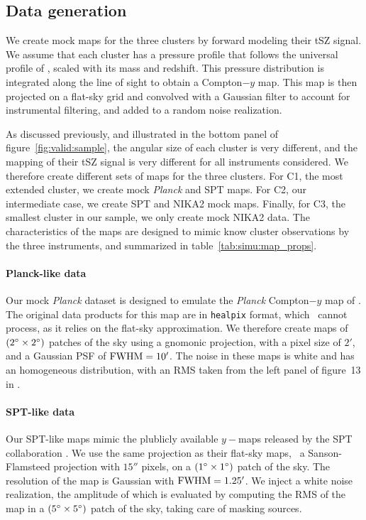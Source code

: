\subsection{Data generation}

We create mock maps for the three clusters by forward modeling their tSZ signal.
We assume that each cluster has a pressure profile that follows the universal profile of \aten, scaled with its mass and redshift.
This pressure distribution is integrated along the line of sight to obtain a Compton$-y$ map.
This map is then projected on a flat-sky grid and convolved with a Gaussian filter to account for instrumental filtering, and added to a random noise realization.

As discussed previously, and illustrated in the bottom panel of figure~\ref{fig:valid:sample}, the angular size of each cluster is very different, and the mapping of their tSZ signal is very different for all instruments considered.
We therefore create different sets of maps for the three clusters.
For C1, the most extended cluster, we create mock \textit{Planck} and SPT maps.
For C2, our intermediate case, we create SPT and NIKA2 mock maps.
Finally, for C3, the smallest cluster in our sample, we only create mock NIKA2 data.
The characteristics of the maps are designed to mimic know cluster observations by the three instruments, and summarized in table~\ref{tab:simu:map_props}.

\paragraph{Planck-like data}
Our mock \textit{Planck} dataset is designed to emulate the \textit{Planck} Compton$-y$ map of \citet{planck_collaboration_planck_2016}.
The original data products for this map are in \texttt{healpix} format, which \panco\ cannot process, as it relies on the flat-sky approximation.
We therefore create maps of $(2\degree \times 2\degree)$ patches of the sky using a gnomonic projection, with a pixel size of $2'$, and a Gaussian PSF of ${\rm FWHM} = 10'$.
The noise in these maps is white and has an homogeneous distribution, with an RMS taken from the left panel of figure~13 in \citet{planck_collaboration_planck_2016}.

\paragraph{SPT-like data}
Our SPT-like maps mimic the plublicly available $y-$maps released by the SPT collaboration \citep{bleem_cmbksz_2022}.
We use the same projection as their flat-sky maps, \ie\ a Sanson-Flamsteed projection with $15''$ pixels, on a $(1\degree \times 1\degree)$ patch of the sky.
The resolution of the map is Gaussian with ${\rm FWHM} = 1.25'$.
We inject a white noise realization, the amplitude of which is evaluated by computing the RMS of the map in a $(5\degree \times 5\degree)$ patch of the sky, taking care of masking sources.

